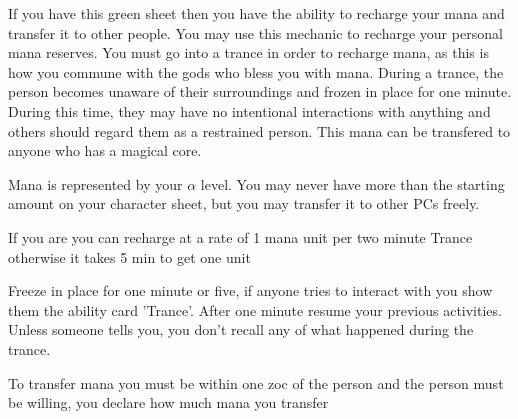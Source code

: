 \documentclass[green]{guildcamp3}
\begin{document}
	
	\name{\gManaRecharge{}}
	
	
	
	
	
	If you have this green sheet then you have the ability to recharge your mana and transfer it to other people.
	You may use this mechanic to recharge your personal mana reserves. You must go into a trance in order to recharge mana, as this is how you commune with the gods who bless you with mana. 	During a trance, the person becomes unaware of their surroundings and frozen in place for one minute. During this time, they may have no intentional interactions with anything and others should regard them as a restrained person. This mana can be transfered to anyone who has a magical core. 
	
	Mana is represented by your $\alpha$ level. You may never have more than the starting amount on your character sheet, but you may transfer it to other PCs freely.
	
	
	
	
	\begin{enum}[Directions]
		\item If you are \cPaladin{} you can recharge at a rate of 1 mana unit per two minute Trance otherwise it takes 5 min to get one unit 
		\item Freeze in place for one minute or five, if anyone tries to interact with you show them the ability card 'Trance'. After one minute resume your previous activities. Unless someone tells you, you don't recall any of what happened during the trance.
		\item To transfer mana you must be within one zoc of the person and the person must be willing, you declare how much mana you transfer
	\end{enum}
	
\end{document}
